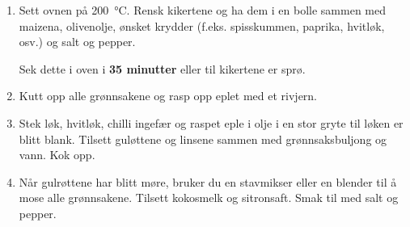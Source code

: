 \begin{enumerate}
    \item
    Sett ovnen på \SI{200}{\celsius}.
    Rensk kikertene og ha dem i en bolle sammen med maizena, olivenolje, ønsket krydder (f.eks. spisskummen, paprika, hvitløk, osv.) og salt og pepper.
    
    Sek dette i oven i \textbf{35 minutter} eller til kikertene er sprø.
    
    \item 
    Kutt opp alle grønnsakene og rasp opp eplet med et rivjern.
    
    \item
    Stek løk, hvitløk, chilli ingefær og raspet eple i olje i en stor gryte til løken er blitt blank. 
    Tilsett guløttene og linsene sammen med grønnsaksbuljong og vann. 
    Kok opp.
    
    \item
    Når gulrøttene har blitt møre, bruker du en stavmikser eller en blender til å mose alle grønnsakene.
    Tilsett kokosmelk og sitronsaft.
    Smak til med salt og pepper.
    
\end{enumerate}